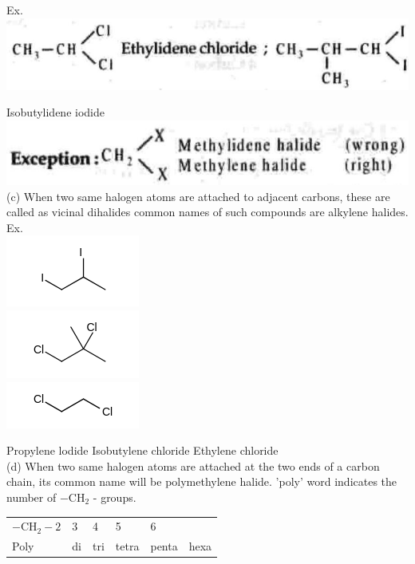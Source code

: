 \documentclass[10pt]{article}
\begin{document}
Ex.\\
\includegraphics[max width=\textwidth, center]{2025_01_28_8470952b98110cec3aabg-013(1)}

Isobutylidene iodide\\
\includegraphics[max width=\textwidth, center]{2025_01_28_8470952b98110cec3aabg-013(3)}\\
(c) When two same halogen atoms are attached to adjacent carbons, these are called as vicinal dihalides common names of such compounds are alkylene halides.\\
Ex.\\
\includegraphics{smile-a061a72aef109c86ac9fd28102ddc28b6de2d43f}\\
\includegraphics{smile-98f924914bb8b3d12738c4de9a6d5aaddcc33316}\\
\includegraphics{smile-f5ed8561f741b1683d2b72351e633a590d7ed07b}

Propylene lodide Isobutylene chloride Ethylene chloride\\
(d) When two same halogen atoms are attached at the two ends of a carbon chain, its common name will be polymethylene halide. 'poly' word indicates the number of $-\mathrm{CH}_{2}$ - groups.

\begin{center}
\begin{tabular}{llllll}
$-\mathrm{CH}_{2}-2$ & 3 & 4 & 5 & 6 &  \\
Poly & di & tri & tetra & penta & hexa \\
\end{tabular}
\end{center}
\end{document}
